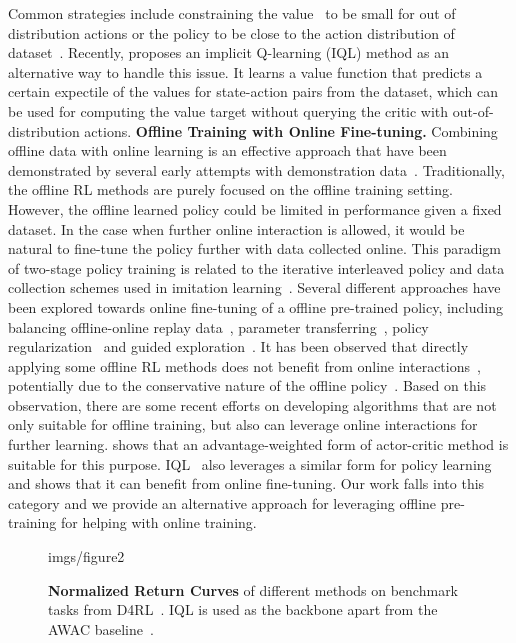 \documentclass{article}
\begin{document}
Common strategies include  constraining the value~\citep{cql} to be small for out of distribution actions or the policy to be close to the action distribution of dataset~\citep{BCQ, td3bc}.
Recently, \cite{iql} proposes an implicit Q-learning (IQL) method as an alternative way
to handle this issue. It learns a value function that predicts a certain expectile of the values for  state-action pairs from the dataset, which can be used for computing the value target
without querying the critic with out-of-distribution actions.
\vspace{-0.1in}
{\flushleft\textbf{Offline Training with Online Fine-tuning.}}
Combining offline data with online learning is an effective approach that have been demonstrated by several early attempts with demonstration data~\citep{use_offline_buffer,dqn_demo,sac_bc, DAPG}.
Traditionally, the offline RL methods are purely focused on the offline training setting.
However, the offline learned policy could be limited in performance given a fixed dataset.
In the case when further online interaction is allowed, it would be natural to fine-tune
the policy further with data collected online.
This paradigm of two-stage policy training is related to the iterative interleaved policy and data collection schemes used in imitation learning~\citep{dagger, agnoistic_system_id_mbrl}.
Several different approaches have been explored towards online fine-tuning of a offline pre-trained policy, including balancing offline-online replay data~\citep{balanced_replay}, parameter transferring~\citep{DAPG, policy_finetuing}, policy regularization~\citep{KL_RL, behavior_prior}
and guided exploration~\citep{behavior_transfer, jump_start_RL}.
It has been observed that directly applying some offline RL methods does not
benefit from online interactions~\citep{AWAC,jump_start_RL}, potentially due to the conservative nature of the offline policy~\citep{AWAC}.
Based on this observation, there are some recent efforts on developing algorithms
that are not only suitable for offline training, but also can leverage online interactions for further learning.
\cite{AWAC} shows that an advantage-weighted form of actor-critic method is suitable for this purpose.
IQL~\citep{iql} also leverages a similar form for policy learning and shows that it can benefit from online fine-tuning.
Our work falls into this category and we provide an alternative approach for leveraging
offline pre-training for helping with online training.


\begin{figure}[t]
	\centering
	\begin{overpic}[width=14cm]{imgs/figure2}
	\end{overpic}
	\vspace{-0.2in}
	\caption{\textbf{Normalized Return Curves} of different methods on benchmark tasks from D4RL~\citep{d4rl}. IQL is used as the backbone apart from the AWAC baseline~\citep{AWAC}.}
	\vspace{-0.2in}
	\label{fig:d4rl_results}
\end{figure}
\end{document}
